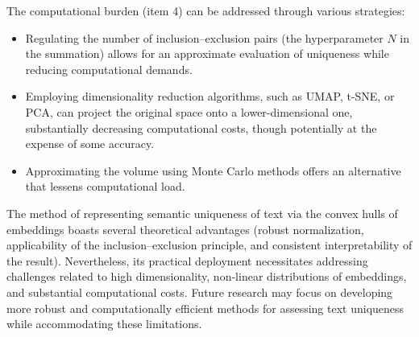 The computational burden (item 4) can be addressed through various strategies:
\begin{itemize}
    \item Regulating the number of inclusion–exclusion pairs (the hyperparameter $N$ in the summation) allows for an approximate evaluation
    of uniqueness while reducing computational demands.
    \item Employing dimensionality reduction algorithms, such as UMAP, t-SNE, or PCA, can project the original space onto a lower-dimensional one,
    substantially decreasing computational costs, though potentially at the expense of some accuracy.
    \item Approximating the volume using Monte Carlo methods offers an alternative that lessens computational load.
\end{itemize}

The method of representing semantic uniqueness of text via the convex hulls of embeddings boasts several theoretical advantages (robust normalization,
applicability of the inclusion–exclusion principle, and consistent interpretability of the result). Nevertheless, its practical deployment necessitates
addressing challenges related to high dimensionality, non-linear distributions of embeddings, and substantial computational costs. Future research may
focus on developing more robust and computationally efficient methods for assessing text uniqueness while accommodating these limitations.
